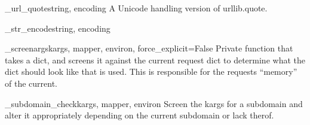 \documentclass[letterpaper,10pt,english]{manual}
\begin{document}
\hypertarget{routes.util.\_url\_quote}{}\begin{funcdesc}{\_url\_quote}{string, encoding}
A Unicode handling version of urllib.quote.
\end{funcdesc}

\hypertarget{routes.util.\_str\_encode}{}\begin{funcdesc}{\_str\_encode}{string, encoding}\end{funcdesc}

\hypertarget{routes.util.\_screenargs}{}\begin{funcdesc}{\_screenargs}{kargs, mapper, environ, force\_explicit=False}
Private function that takes a dict, and screens it against the current 
request dict to determine what the dict should look like that is used. 
This is responsible for the requests ``memory'' of the current.
\end{funcdesc}

\hypertarget{routes.util.\_subdomain\_check}{}\begin{funcdesc}{\_subdomain\_check}{kargs, mapper, environ}
Screen the kargs for a subdomain and alter it appropriately depending
on the current subdomain or lack therof.
\end{funcdesc}


\renewcommand{\indexname}{Module Index}

\renewcommand{\indexname}{Index}
\printindex
\end{document}

